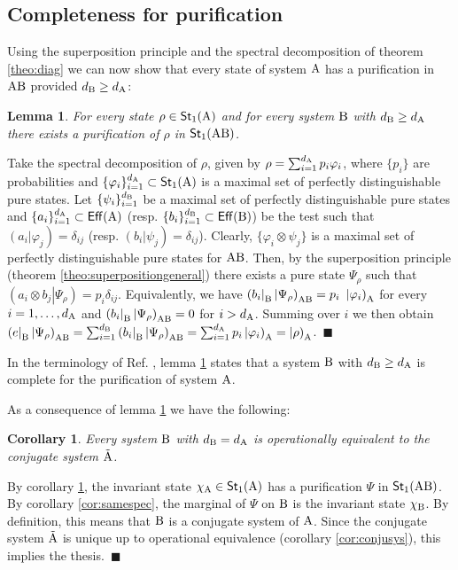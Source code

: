 \documentclass[12pt,aps,pra,showpacs,groupedaddress]{revtex4-1}
\newtheorem{lemma}{Lemma} \newtheorem{proposition}{Proposition}
\newtheorem{corollary}{Corollary} \newtheorem{theorem}{Theorem}
\def\Proof{\medskip\par\noindent{\bf Proof. }}
\def\qed{$\,\blacksquare$\par}
\def\rB{{\rm B}}
\def\Cntset{{\mathsf{Eff}}}
\def\Stset{{\mathsf{St}}}
\def\K#1{\left|#1\right)}  \def\B#1{\left(#1\right|}
\def\SC#1#2{\left(#1\right|\left.\!#2\right)}  \def\Tr{{\rm Tr}}
\begin{document}
\subsection{Completeness for purification}
Using the superposition principle and the spectral decomposition of theorem \ref{theo:diag} we can now show that every state of system ${\rm A}$ has a purification in $\rA\rB$ provided $d_\rB \ge d_\rA$:
\begin{lemma}\label{lem:completenessforpurification}
For every state $\rho \in \Stset_1 (\rA)$ and for every system $\rB$ with $d_\rB \ge d_\rA$  there exists a purification of $\rho$  in  $\Stset_1(\rA\rB)$.
\end{lemma}  

\Proof Take the spectral decomposition of $\rho$, given by $\rho =
\sum_{i=1}^{d_{\rm A}} p_i \varphi_i $, where $\{p_i\}$ are probabilities
and $\{\varphi_i\}_{i=1}^{d_\rA} \subset \Stset_1 (\rA)$ is a maximal
set of perfectly distinguishable pure states.  Let $\{\psi_i\}_{i=
  1}^{d_\rB}$ be a maximal set of perfectly distinguishable pure
states and $\{a_i\}_{i=1}^{d_\rA} \subset \Cntset (\rA)$ (resp.
$\{b_i\}_{i=1}^{d_\rB} \subset \Cntset(\rB)$) be the test such that
$\SC {a_i}{\varphi_j} = \delta_{ij}$ (resp. $\SC {b_i}{\psi_j} =
\delta_{ij}$).  Clearly, $\{\varphi_i \otimes \psi_j\}$ is a maximal
set of perfectly distinguishable pure states for $\rA\rB$.  Then, by
the superposition principle (theorem \ref{theo:superpositiongeneral})
there exists a pure state $\Psi_{\rho}$ such that $\SC {a_i \otimes b_j} {\Psi_\rho} = p_i \delta_{ij} $.  
Equivalently, we have $\B {b_i}_\rB \K {\Psi_\rho}_{\rA\rB} = p_i ~ \K {\varphi_i}_\rA$  for every $i=1, \dots, d_{\rm A}$ and $\B {b_i}_\rB \K {\Psi_\rho}_{\rA\rB}=0$ for $i>d_{\rm A}$.
Summing over $i$ we then obtain $\B e_\rB \K{\Psi_\rho}_{\rA\rB} =
\sum_{i=1}^{d_\rB} \B{b_i}_\rB \K{ \Psi_\rho}_{\rA\rB} = \sum_{i=1}^{d_\rA}
p_i\K{\varphi_i}_\rA = \K \rho_\rA$. \qed

In the terminology of Ref. \cite{purification}, lemma \ref{lem:completenessforpurification} states that a system $\rB$ with $d_\rB \ge d_\rA$  is complete for the purification of system ${\rm A}$.


As a consequence of lemma \ref{lem:completenessforpurification} we have the following:
\begin{corollary}\label{cor:tutticoniugati}
Every system $\rB$ with $d_\rB = d_\rA $ is operationally equivalent to the conjugate system $\tilde {{\rm A}}$.  
\end{corollary}
\Proof By corollary \ref{lem:completenessforpurification}, the invariant state $\chi_\rA \in\Stset_1 (\rA)$ has a purification $\Psi$ in $\Stset_1 (\rA\rB)$. By corollary \ref{cor:samespec},  the marginal of $\Psi$ on $\rB$ is the invariant state $\chi_\rB$.   By definition, this means that $\rB$  is a conjugate system of ${\rm A}$.  Since the conjugate system $\tilde {{\rm A}}$ is unique up to operational equivalence (corollary \ref{cor:conjusys}),  this implies the thesis. \qed  
  
\end{document}
